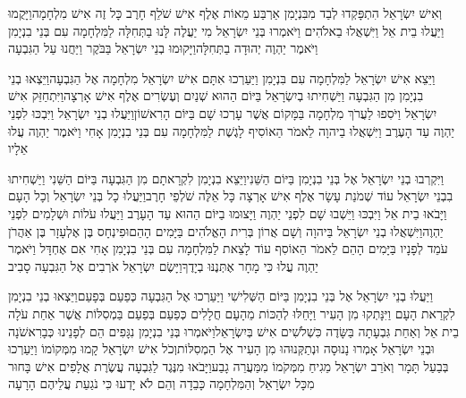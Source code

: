 \documentclass[../main/main.tex]{subfiles}
\begin{document}
\begin{multicols*}{\ncols}
וְאִישׁ יִשְׂרָאֵל הִתְפָּקְדוּ לְבַד מִבִּנְיָמִן אַרְבַּע מֵאוֹת אֶלֶף אִישׁ שֹׁלֵף חָרֶב כָּל זֶה אִישׁ מִלְחָמָה\PreVerseSpace{}וַיָּקֻמוּ וַיַּעֲלוּ בֵית אֵל וַיִּשְׁאֲלוּ בֵאלֹהִים וַיֹּאמְרוּ בְּנֵי יִשְׂרָאֵל מִי יַעֲלֶה לָּנוּ בַתְּחִלָּה לַמִּלְחָמָה עִם בְּנֵי בִנְיָמִן וַיֹּאמֶר יַהְוֶה יְהוּדָה בַתְּחִלָּה\PreVerseSpace{}וַיָּקוּמוּ בְנֵי יִשְׂרָאֵל בַּבֹּקֶר וַיַּחֲנוּ עַל הַגִּבְעָה\OpenSection{}\par
{}וַיֵּצֵא אִישׁ יִשְׂרָאֵל לַמִּלְחָמָה עִם בִּנְיָמִן וַיַּעַרְכוּ אִתָּם אִישׁ יִשְׂרָאֵל מִלְחָמָה אֶל הַגִּבְעָה\PreVerseSpace{}וַיֵּצְאוּ בְנֵי בִנְיָמִן מִן הַגִּבְעָה וַיַּשְׁחִיתוּ בְיִשְׂרָאֵל בַּיּוֹם הַהוּא שְׁנַיִם וְעֶשְׂרִים אֶלֶף אִישׁ אָרְצָה\PreVerseSpace{}וַיִּתְחַזֵּק  אִישׁ יִשְׂרָאֵל וַיֹּסִפוּ לַעֲרֹךְ מִלְחָמָה בַּמָּקוֹם אֲשֶׁר עָרְכוּ שָׁם בַּיּוֹם הָרִאשׁוֹן\PreVerseSpace{}וַיַּעֲלוּ בְנֵי יִשְׂרָאֵל וַיִּבְכּוּ לִפְנֵי יַהְוֶה עַד הָעֶרֶב וַיִּשְׁאֲלוּ בַיהוָה לֵאמֹר הַאוֹסִיף לָגֶשֶׁת לַמִּלְחָמָה עִם בְּנֵי בִנְיָמִן אָחִי וַיֹּאמֶר יַהְוֶה עֲלוּ אֵלָיו\OpenSection{}\par
{}וַיִּקְרְבוּ בְנֵי יִשְׂרָאֵל אֶל בְּנֵי בִנְיָמִן בַּיּוֹם הַשֵּׁנִי\PreVerseSpace{}וַיֵּצֵא בִנְיָמִן לִקְרָאתָם מִן הַגִּבְעָה בַּיּוֹם הַשֵּׁנִי וַיַּשְׁחִיתוּ בִבְנֵי יִשְׂרָאֵל עוֹד שְׁמֹנַת עָשָׂר אֶלֶף אִישׁ אָרְצָה כָּל אֵלֶּה שֹׁלְפֵי חָרֶב\PreVerseSpace{}וַיַּעֲלוּ כָל בְּנֵי יִשְׂרָאֵל וְכָל הָעָם וַיָּבֹאוּ בֵית אֵל וַיִּבְכּוּ וַיֵּשְׁבוּ שָׁם לִפְנֵי יַהְוֶה וַיָּצוּמוּ בַיּוֹם הַהוּא עַד הָעָרֶב וַיַּעֲלוּ עֹלוֹת וּשְׁלָמִים לִפְנֵי יַהְוֶה\PreVerseSpace{}וַיִּשְׁאֲלוּ בְנֵי יִשְׂרָאֵל בַּיהוָה וְשָׁם אֲרוֹן בְּרִית הָאֱלֹהִים בַּיָּמִים הָהֵם\PreVerseSpace{}וּפִינְחָס בֶּן אֶלְעָזָר בֶּן אַהֲרֹן עֹמֵד לְפָנָיו בַּיָּמִים הָהֵם לֵאמֹר הַאוֹסִף עוֹד לָצֵאת לַמִּלְחָמָה עִם בְּנֵי בִנְיָמִן אָחִי אִם אֶחְדָּל וַיֹּאמֶר יַהְוֶה עֲלוּ כִּי מָחָר אֶתְּנֶנּוּ בְיָדֶךָ\PreVerseSpace{}וַיָּשֶׂם יִשְׂרָאֵל אֹרְבִים אֶל הַגִּבְעָה סָבִיב\OpenSection{}\par
{}וַיַּעֲלוּ בְנֵי יִשְׂרָאֵל אֶל בְּנֵי בִנְיָמִן בַּיּוֹם הַשְּׁלִישִׁי וַיַּעַרְכוּ אֶל הַגִּבְעָה כְּפַעַם בְּפָעַם\PreVerseSpace{}וַיֵּצְאוּ בְנֵי בִנְיָמִן לִקְרַאת הָעָם וַיִּנָּתְקוּ\SubEnd{} מִן הָעִיר וַיָּחֵלּוּ לְהַכּוֹת מֵהָעָם חֲלָלִים כְּפַעַם בְּפַעַם בַּמְסִלּוֹת אֲשֶׁר אַחַת עֹלָה בֵית אֵל וְאַחַת גִּבְעָתָה בַּשָּׂדֶה כִּשְׁלֹשִׁים אִישׁ בְּיִשְׂרָאֵל\PreVerseSpace{}וַיֹּאמְרוּ בְּנֵי בִנְיָמִן נִגָּפִים הֵם לְפָנֵינוּ כְּבָרִאשֹׁנָה וּבְנֵי יִשְׂרָאֵל אָמְרוּ נָנוּסָה וּנְתַקְּנוּהוּ מִן הָעִיר אֶל הַמְסִלּוֹת\PreVerseSpace{}וְכֹל אִישׁ יִשְׂרָאֵל קָמוּ מִמְּקוֹמוֹ וַיַּעַרְכוּ בְּבַעַל תָּמָר וְאֹרֵב יִשְׂרָאֵל מֵגִיחַ מִמְּקֹמוֹ מִמַּעֲרֵה גָבַע\PreVerseSpace{}וַיָּבֹאוּ מִנֶּגֶד לַגִּבְעָה עֲשֶׂרֶת אֲלָפִים אִישׁ בָּחוּר מִכָּל יִשְׂרָאֵל וְהַמִּלְחָמָה כָּבֵדָה וְהֵם לֹא יָדְעוּ כִּי נֹגַעַת עֲלֵיהֶם הָרָעָה\OpenSection{}\par

\end{multicols*}
\end{document}
